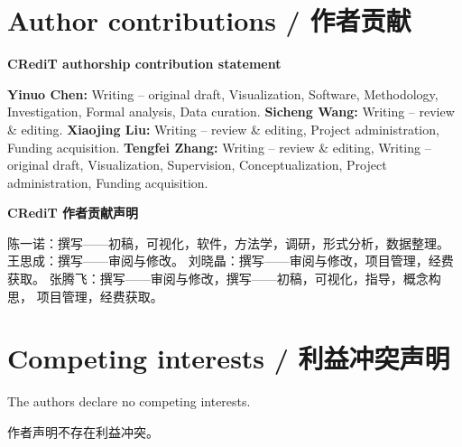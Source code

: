 \documentclass[11pt,a4paper]{article}
\begin{document}
\section*{Author contributions / 作者贡献}

\textbf{CRediT authorship contribution statement}

\textbf{Yinuo Chen:} Writing -- original draft, Visualization, Software,
Methodology, Investigation, Formal analysis, Data curation.
\textbf{Sicheng Wang:} Writing -- review \& editing.
\textbf{Xiaojing Liu:} Writing -- review \& editing, Project
administration, Funding acquisition.
\textbf{Tengfei Zhang:} Writing -- review \& editing, Writing -- original
draft, Visualization, Supervision, Conceptualization, Project
administration, Funding acquisition.

\textbf{CRediT 作者贡献声明}

陈一诺：撰写——初稿，可视化，软件，方法学，调研，形式分析，数据整理。
王思成：撰写——审阅与修改。
刘晓晶：撰写——审阅与修改，项目管理，经费获取。
张腾飞：撰写——审阅与修改，撰写——初稿，可视化，指导，概念构思，
项目管理，经费获取。

\section*{Competing interests / 利益冲突声明}

The authors declare no competing interests.

作者声明不存在利益冲突。
\end{document}
